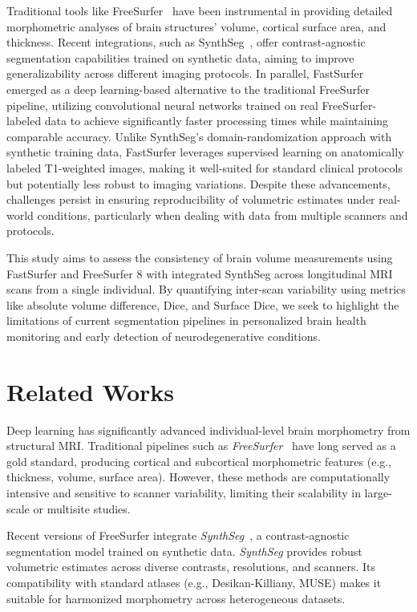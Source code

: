 \documentclass{midl} %
\begin{document}
Traditional tools like FreeSurfer~\citep{Fischl2012FS} have been instrumental in providing detailed morphometric analyses of brain structures' volume, cortical surface area, and thickness. Recent integrations, such as SynthSeg~\citep{Billot2023SynthSeg}, offer contrast-agnostic segmentation capabilities trained on synthetic data, aiming to improve generalizability across different imaging protocols. In parallel, FastSurfer~\citep{Henschel2020FastSurfer} emerged as a deep learning-based alternative to the traditional FreeSurfer pipeline, utilizing convolutional neural networks trained on real FreeSurfer-labeled data to achieve significantly faster processing times while maintaining comparable accuracy. Unlike SynthSeg's domain-randomization approach with synthetic training data, FastSurfer leverages supervised learning on anatomically labeled T1-weighted images, making it well-suited for standard clinical protocols but potentially less robust to imaging variations. Despite these advancements, challenges persist in ensuring reproducibility of volumetric estimates under real-world conditions, particularly when dealing with data from multiple scanners and protocols.

This study aims to assess the consistency of brain volume measurements using FastSurfer and FreeSurfer 8 with integrated SynthSeg across longitudinal MRI scans from a single individual. By quantifying inter-scan variability using metrics like absolute volume difference, Dice, and Surface Dice, we seek to highlight the limitations of current segmentation pipelines in personalized brain health monitoring and early detection of neurodegenerative conditions.


\section{Related Works}


Deep learning has significantly advanced individual-level brain morphometry from structural MRI. Traditional pipelines such as \textit{FreeSurfer}~\citep{Fischl2012FS} have long served as a gold standard, producing cortical and subcortical morphometric features (e.g., thickness, volume, surface area). However, these methods are computationally intensive and sensitive to scanner variability, limiting their scalability in large-scale or multisite studies.
    
Recent versions of FreeSurfer integrate \textit{SynthSeg}~\citep{Billot2023SynthSeg}, a contrast-agnostic segmentation model trained on synthetic data. \textit{SynthSeg} provides robust volumetric estimates across diverse contrasts, resolutions, and scanners. Its compatibility with standard atlases (e.g., Desikan-Killiany, MUSE) makes it suitable for harmonized morphometry across heterogeneous datasets.
\end{document}
